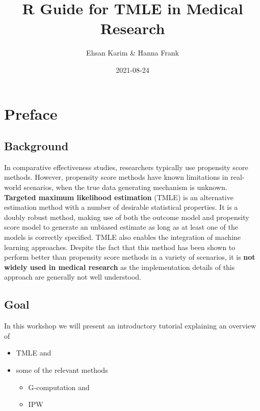 \documentclass[
]{book}
\title{R Guide for TMLE in Medical Research}
\author{Ehsan Karim \& Hanna Frank}
\date{2021-08-24}
\providecommand{\tightlist}{%
  \setlength{\itemsep}{0pt}\setlength{\parskip}{0pt}}
\begin{document}
\maketitle

{
\setcounter{tocdepth}{1}
\tableofcontents
}
\newenvironment{blackbox}{
  \definecolor{shadecolor}{rgb}{0, 0, 0}  %
  \color{white}
  \begin{shaded}}
 {\end{shaded}}

\hypertarget{preface}{%
\chapter*{Preface}\label{preface}}

\hypertarget{background}{%
\section*{Background}\label{background}}

In comparative effectiveness studies, researchers typically use propensity score methods. However, propensity score methods have known limitations in real-world scenarios, when the true data generating mechanism is unknown. \textbf{Targeted maximum likelihood estimation} (TMLE) is an alternative estimation method with a number of desirable statistical properties. It is a doubly robust method, making use of both the outcome model and propensity score model to generate an unbiased estimate as long as at least one of the models is correctly specified. TMLE also enables the integration of machine learning approaches. Despite the fact that this method has been shown to perform better than propensity score methods in a variety of scenarios, it is \textbf{not widely used in medical research} as the implementation details of this approach are generally not well understood.

\hypertarget{goal}{%
\section*{Goal}\label{goal}}

In this workshop we will present an introductory tutorial explaining an overview of

\begin{itemize}
\tightlist
\item
  TMLE and
\item
  some of the relevant methods

  \begin{itemize}
  \tightlist
  \item
    G-computation and
  \item
    IPW
  \end{itemize}
\end{itemize}
\end{document}
